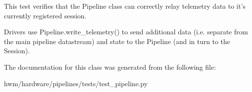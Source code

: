 This test verifies that the Pipeline class can correctly relay telemetry data to it's currently registered session. 

Drivers use Pipeline.\-write\-\_\-telemetry() to send additional data (i.\-e. separate from the main pipeline datastream) and state to the Pipeline (and in turn to the Session). 

The documentation for this class was generated from the following file\-:\begin{DoxyCompactItemize}
\item 
hwm/hardware/pipelines/tests/test\-\_\-pipeline.\-py\end{DoxyCompactItemize}
